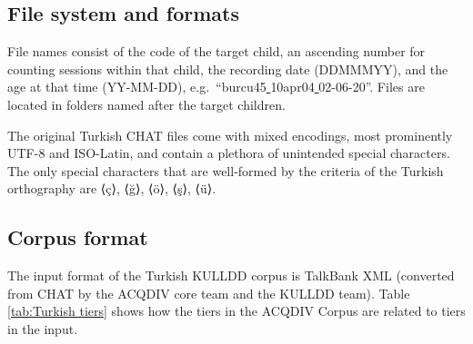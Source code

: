 \documentclass[a4paper, 11pt]{book}
\newcommand{\und}{\underline{{ }}\hspace{0.2mm}}	%
\begin{document}
\subsection{File system and formats}

File names consist of the code of the target child, an ascending number for counting sessions within that child, the recording date (DDMMMYY), and the age at that time (YY-MM-DD), e.g.\ “burcu45\und 10apr04\und 02-06-20”. Files are located in folders named after the target children.

The original Turkish CHAT files come with mixed encodings, most prominently UTF-8 and ISO-Latin, and contain a plethora of unintended special characters. The only special characters that are well-formed by the criteria of the Turkish orthography are ⟨ç⟩, ⟨ğ⟩, ⟨ö⟩, ⟨ş⟩, ⟨ü⟩.


\subsection{Corpus format}

The input format of the Turkish KULLDD corpus is TalkBank XML (converted from CHAT by the ACQDIV core team and the KULLDD team). Table \autoref{tab:Turkish tiers} shows how the tiers in the ACQDIV Corpus are related to tiers in the input.
\end{document}
